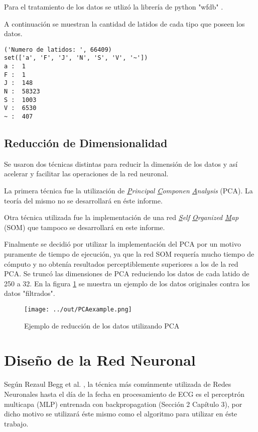\documentclass[conference]{IEEEtran}
\theoremstyle{definition}
\begin{document}
Para el tratamiento de los datos se utliz\'{o} la librer\'{i}a de python "wfdb" \cite{WFDB}.

A continuaci\'{o}n se muestran la cantidad de latidos de cada tipo que poseen los datos.

\begin{lstlisting}[frame=single]
('Numero de latidos: ', 66409)
set(['a', 'F', 'J', 'N', 'S', 'V', '~'])
a :  1
F :  1
J :  148
N :  58323
S :  1003
V :  6530
~ :  407
\end{lstlisting}

\subsection{Reducci\'{o}n de Dimensionalidad}

Se usaron dos t\'{e}cnicas distintas para reducir la dimensi\'{o}n de los datos y as\'{i} acelerar y facilitar las operaciones de la red neuronal.

La primera t\'{e}cnica fue la utilizaci\'{o}n de \textit{\underline{P}rincipal \underline{C}omponen \underline{A}nalysis} (PCA). La teor\'{i}a del mismo no se desarrollar\'{a} en \'{e}ste informe.

Otra t\'{e}cnica utilizada fue la implementaci\'{o}n de una red \textit{\underline{S}elf \underline{O}rganized \underline{M}ap} (SOM) que tampoco se desarrollar\'{a} en este informe.

Finalmente se decidi\'{o} por utilizar la implementaci\'{o}n del PCA por un motivo puramente de tiempo de ejecuci\'{o}n, ya que la red SOM requer\'{i}a mucho tiempo de c\'{o}mputo y no obten\'{i}a resultados perceptiblemente superiores a los de la red PCA. Se trunc\'{o} las dimensiones de PCA reduciendo los datos de cada latido de 250 a 32. En la figura \ref{fig_pca_reduction} se muestra un ejemplo de los datos originales contra los datos "filtrados".

\begin{figure}[H]
	\centering
	\texttt{[image: ../out/PCAexample.png]}
	\caption{Ejemplo de reducci\'{o}n de los datos utilizando PCA}
	\label{fig_pca_reduction}
\end{figure}

\section{Dise\~{n}o de la Red Neuronal}

Seg\'{u}n Rezaul Begg et al. \cite{NN_HEALTHCARE}, la t\'{e}cnica m\'{a}s com\'{u}nmente utilizada de Redes Neuronales hasta el d\'{i}a de la fecha en procesamiento de ECG es el perceptr\'{o}n multicapa (MLP) entrenada con backpropagation (Secci\'{o}n 2 Cap\'{i}tulo 3), por dicho motivo se utilizar\'{a} \'{e}ste mismo como el algoritmo para utilizar en \'{e}ste trabajo.
\end{document}
